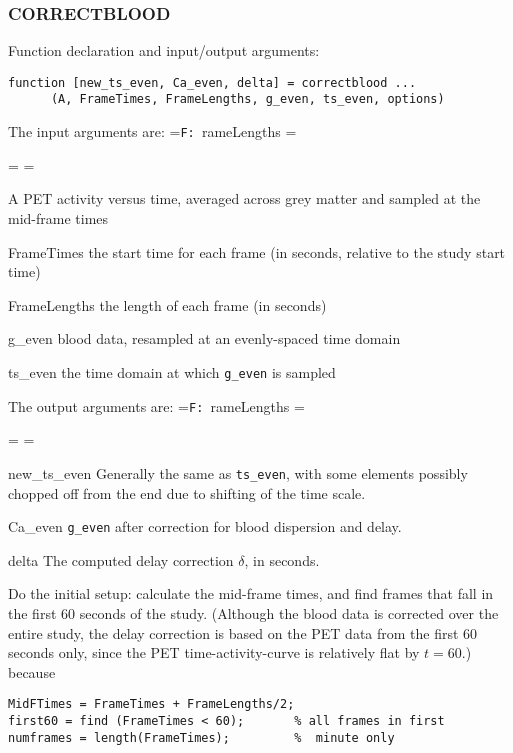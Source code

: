 \documentclass[12pt]{article}
\def\code#1{{\tt #1}}
\def\ttlabel#1{{\tt #1: }}
\newenvironment{ttdescription}[1]
{\newbox\holder
 \setbox\holder=\hbox{\ttlabel#1}
 \dimen0=\wd\holder
 \begin{list}{}
 {\labelsep=-0.25in
  \rightmargin=0.25in
  \leftmargin=\dimen0
  \addtolength{\leftmargin}{0.25in}
  \labelwidth=\leftmargin
  \let\makelabel\ttlabel}}%
{\end{list}}
\begin{document}
\subsubsection{CORRECTBLOOD}
\label{sec:correctblood_listing}

\begin{enumerate}

\item Function declaration and input/output arguments:
  \begin{verbatim}
function [new_ts_even, Ca_even, delta] = correctblood ...
      (A, FrameTimes, FrameLengths, g_even, ts_even, options)
  \end{verbatim}
The input arguments are:
%
\begin{ttdescription}{FrameLengths}
  \item[A] PET activity versus time, averaged across grey matter and
    sampled at the mid-frame times
  \item[FrameTimes] the start time for each frame (in seconds,
    relative to the study start time)
  \item[FrameLengths] the length of each frame (in seconds)
  \item[g\_even] blood data, resampled at an evenly-spaced time domain
  \item[ts\_even] the time domain at which \code{g\_even} is sampled
\end{ttdescription}
The output arguments are:
\begin{ttdescription}{FrameLengths}
\item[new\_ts\_even] Generally the same as \code{ts\_even}, with some
  elements possibly chopped off from the end due to shifting of the
  time scale.
\item[Ca\_even] \code{g\_even} after correction for blood dispersion
  and delay.
\item[delta] The computed delay correction $\delta$, in seconds.
\end{ttdescription}


\item Do the initial setup: calculate the mid-frame times, and find
  frames that fall in the first 60 seconds of the study.  (Although
  the blood data is corrected over the entire study, the delay
  correction is based on the PET data from the first 60 seconds only,
  since the PET time-activity-curve is relatively flat by $t=60$.)
  because
\begin{verbatim}
MidFTimes = FrameTimes + FrameLengths/2;
first60 = find (FrameTimes < 60);       % all frames in first
numframes = length(FrameTimes);         %  minute only
\end{verbatim}


\end{enumerate}
\end{document}
